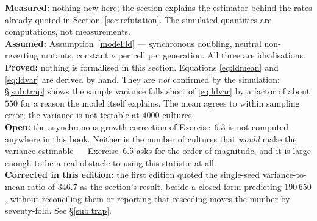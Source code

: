 \begin{ledger}
\textbf{Measured:} nothing new here; the section explains the estimator behind
the rates already quoted in Section~\ref{sec:refutation}. The simulated
quantities are computations, not measurements. \\
\textbf{Assumed:} Assumption~\ref{model:ld} --- synchronous doubling, neutral
non-reverting mutants, constant $\nu$ per cell per generation. All three are
idealisations. \\
\textbf{Proved:} nothing is formalised in this section. Equations
\eqref{eq:ldmean} and \eqref{eq:ldvar} are derived by hand. They are
\emph{not} confirmed by the simulation: \S\ref{sub:trap} shows the sample
variance falls short of \eqref{eq:ldvar} by a factor of about $550$ for a reason
the model itself explains. The mean agrees to within sampling error; the variance
is not testable at $4000$ cultures. \\
\textbf{Open:} the asynchronous-growth correction of Exercise~6.3 is not computed
anywhere in this book. Neither is the number of cultures that \emph{would} make
the variance estimable --- Exercise~6.5 asks for the order of magnitude, and it
is large enough to be a real obstacle to using this statistic at all. \\
\textbf{Corrected in this edition:} the first edition quoted the single-seed
variance-to-mean ratio of $346.7$ as the section's result, beside a closed form
predicting $190\,650$, without reconciling them or reporting that reseeding moves
the number by seventy-fold. See \S\ref{sub:trap}.
\end{ledger}
